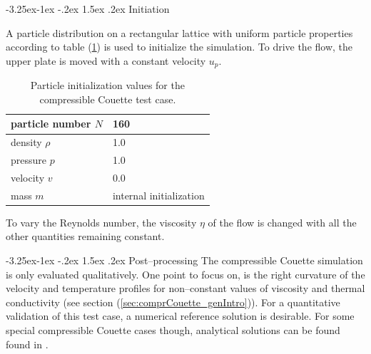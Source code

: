 \documentclass{report}
\makeatletter
\renewcommand\paragraph{\@startsection{paragraph}{4}{\z@}%
  {-3.25ex\@plus -1ex \@minus -.2ex}%
  {1.5ex \@plus .2ex}%
  {\normalfont\normalsize\bfseries}}
\makeatother
\begin{document}
\paragraph {Initiation}

A particle distribution on a rectangular lattice with uniform particle properties according to table (\ref{tab:InitPartValues_comprCouette}) is used to initialize the simulation.
To drive the flow, the upper plate is moved with a constant velocity $u_p$.%

\begin{table}[h] %
\label{tab:InitPartValues_comprCouette}
\centering

\begin{tabular}[c]{|l|p{5cm}|} %
\hline
\hline
particle number $N$ &  160\\
\hline
density $\rho$ &  1.0\\
\hline
pressure $p$ &  1.0 \\
\hline
velocity $v$ & 0.0\\
\hline
mass $m$ & internal initialization\\
\hline
\hline
\end{tabular}
\caption[]{Particle initialization values for the compressible Couette test case.}

\end{table}

To vary the Reynolds number, the viscosity $\eta$ of the flow is changed with all the other quantities remaining constant. 

\paragraph {Post--processing}
The compressible Couette simulation is only evaluated qualitatively. One point to focus on, is the right curvature of the velocity and temperature profiles for non--constant values of viscosity and thermal conductivity (see section (\ref{sec:comprCouette_genIntro})). For a quantitative validation of this test case, a numerical reference solution is desirable. For some special compressible Couette cases though, analytical solutions can be found found in \cite{Rogers1992}. 
\end{document}
